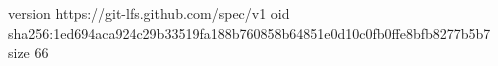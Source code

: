 version https://git-lfs.github.com/spec/v1
oid sha256:1ed694aca924c29b33519fa188b760858b64851e0d10c0fb0ffe8bfb8277b5b7
size 66
